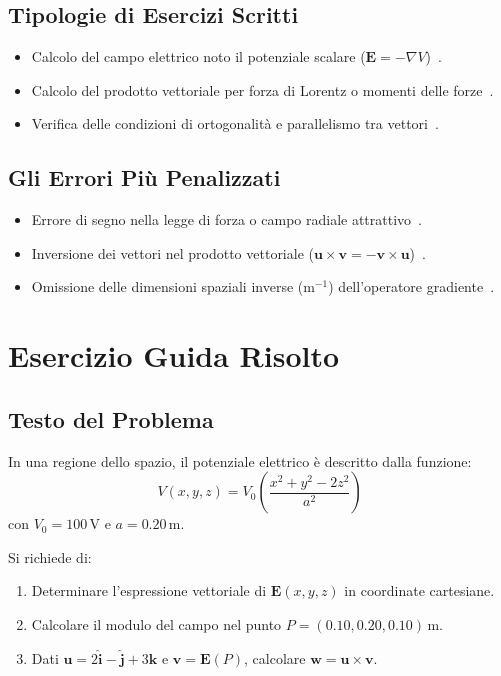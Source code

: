 \documentclass[12pt, a4paper]{article}
\begin{document}
\subsection{Tipologie di Esercizi Scritti}
\begin{itemize}
    \item Calcolo del campo elettrico noto il potenziale scalare ($\mathbf{E} = -\nabla V$)~\cite{2}.
    \item Calcolo del prodotto vettoriale per forza di Lorentz o momenti delle forze~\cite{1, 3}.
    \item Verifica delle condizioni di ortogonalità e parallelismo tra vettori~\cite{1}.
\end{itemize}

\subsection{Gli Errori Più Penalizzati}
\begin{itemize}
    \item Errore di segno nella legge di forza o campo radiale attrattivo~\cite{1}.
    \item Inversione dei vettori nel prodotto vettoriale ($\mathbf{u} \times \mathbf{v} = -\mathbf{v} \times \mathbf{u}$)~\cite{1}.
    \item Omissione delle dimensioni spaziali inverse ($\text{m}^{-1}$) dell'operatore gradiente~\cite{2}.
\end{itemize}

\section{Esercizio Guida Risolto}

\subsection{Testo del Problema}
In una regione dello spazio, il potenziale elettrico è descritto dalla funzione:
\[
V(x,y,z) = V_0 \left( \frac{x^2 + y^2 - 2z^2}{a^2} \right)
\]
con $V_0 = 100 \, \text{V}$ e $a = 0.20 \, \text{m}$.

Si richiede di:
\begin{enumerate}
    \item Determinare l'espressione vettoriale di $\mathbf{E}(x,y,z)$ in coordinate cartesiane.
    \item Calcolare il modulo del campo nel punto $P = (0.10, 0.20, 0.10) \, \text{m}$.
    \item Dati $\mathbf{u} = 2\hat{\mathbf{i}} - \hat{\mathbf{j}} + 3\hat{\mathbf{k}}$ e $\mathbf{v} = \mathbf{E}(P)$, calcolare $\mathbf{w} = \mathbf{u} \times \mathbf{v}$.
\end{enumerate}
\end{document}
